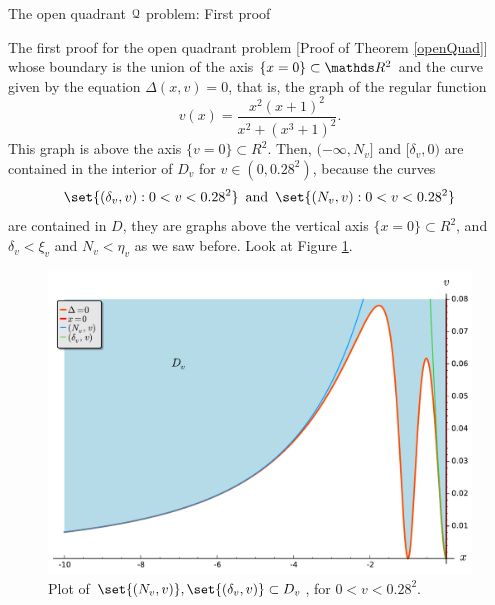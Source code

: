 \documentclass[11pt, a4paper, english, twoside, notitlepage, openright]{report}
\begin{document}
\begin{chapter}{The open quadrant $\mathcal{Q}$ problem: First proof}
\begin{section}{The first proof for the open quadrant problem} [Proof of Theorem \ref{openQuad}]
$$$$ 
whose boundary is the union of the axis $\{x=0\}\subset\R^2$ and the curve given by the equation $\Delta(x,v)=0$, that is, the graph of the regular function
$$
v(x)=\frac{x^2(x+1)^2}{x^2+(x^3+1)^2}.
$$
This graph is above the axis $\{v=0\}\subset R^2$. Then, $(-\infty,N_v]$ and $[\delta_v,0)$ are contained in the interior of $D_v$ for $v\in (0, 0.28^2)$, because the curves 
$$
\set{(\delta_v,v):0<v<0.28^2}\, \, \, \text{and}\, \, \, \set{(N_v,v):0<v<0.28^2}
$$ 
are contained in $D$, they are graphs above the vertical axis $\{x=0\}\subset R^2$, and $\delta_v<\xi_v$ and $N_v<\eta_v$ as we saw before. Look at Figure \ref{fig:nice_plot}.

\begin{figure}[h]
\centering
\includegraphics[width=1\textwidth]{plots/ch1_15_nice_plot.pdf}
\caption{Plot of $\set{(N_v,v)}, \set{(\delta_v,v)}\subset D_v$, for $0<v<0.28^2$.\label{fig:nice_plot}}
\end{figure}

\vspace{1mm}


\end{section}
\end{chapter}
\end{document}
